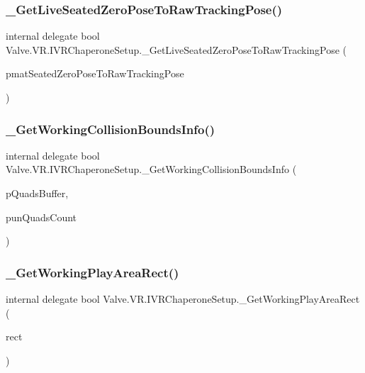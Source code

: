 \subsubsection{\texorpdfstring{\_GetLiveSeatedZeroPoseToRawTrackingPose()}{\_GetLiveSeatedZeroPoseToRawTrackingPose()}}
{\footnotesize\ttfamily internal delegate bool Valve.\+V\+R.\+I\+V\+R\+Chaperone\+Setup.\+\_\+\+Get\+Live\+Seated\+Zero\+Pose\+To\+Raw\+Tracking\+Pose (\begin{DoxyParamCaption}\item[{ref \mbox{\hyperlink{struct_valve_1_1_v_r_1_1_hmd_matrix34__t}{Hmd\+Matrix34\+\_\+t}}}]{pmat\+Seated\+Zero\+Pose\+To\+Raw\+Tracking\+Pose }\end{DoxyParamCaption})}

\mbox{\label{struct_valve_1_1_v_r_1_1_i_v_r_chaperone_setup_ad1822f8ee3c4421e27175ae83ca0c7d9}} 
\subsubsection{\texorpdfstring{\_GetWorkingCollisionBoundsInfo()}{\_GetWorkingCollisionBoundsInfo()}}
{\footnotesize\ttfamily internal delegate bool Valve.\+V\+R.\+I\+V\+R\+Chaperone\+Setup.\+\_\+\+Get\+Working\+Collision\+Bounds\+Info (\begin{DoxyParamCaption}\item[{\mbox{[}\+In, Out\mbox{]} \mbox{\hyperlink{struct_valve_1_1_v_r_1_1_hmd_quad__t}{Hmd\+Quad\+\_\+t}} \mbox{[}$\,$\mbox{]}}]{p\+Quads\+Buffer,  }\item[{ref uint}]{pun\+Quads\+Count }\end{DoxyParamCaption})}

\mbox{\label{struct_valve_1_1_v_r_1_1_i_v_r_chaperone_setup_a9d45f0e7a33aec365ddc6836942a453a}} 
\subsubsection{\texorpdfstring{\_GetWorkingPlayAreaRect()}{\_GetWorkingPlayAreaRect()}}
{\footnotesize\ttfamily internal delegate bool Valve.\+V\+R.\+I\+V\+R\+Chaperone\+Setup.\+\_\+\+Get\+Working\+Play\+Area\+Rect (\begin{DoxyParamCaption}\item[{ref \mbox{\hyperlink{struct_valve_1_1_v_r_1_1_hmd_quad__t}{Hmd\+Quad\+\_\+t}}}]{rect }\end{DoxyParamCaption})}

